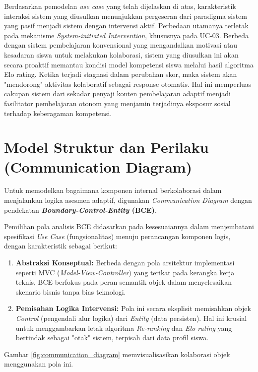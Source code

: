 Berdasarkan pemodelan \textit{use case} yang telah dijelaskan di atas, karakteristik interaksi sistem yang
diusulkan menunjukkan pergeseran dari paradigma sistem yang pasif menjadi sistem dengan intervensi aktif.
Perbedaan utamanya terletak pada mekanisme \textit{System-initiated Intervention}, khususnya pada UC-03.
Berbeda dengan sistem pembelajaran konvensional yang mengandalkan motivasi atau kesadaran siswa untuk
melakukan kolaborasi, sistem yang diusulkan ini akan secara proaktif memantau kondisi model kompetensi siswa
melalui hasil algoritma Elo rating. Ketika terjadi stagnasi dalam perubahan skor, maka sistem akan "mendorong"
aktivitas kolaboratif sebagai response otomatis. Hal ini memperluas cakupan sistem dari sekadar penyaji konten
pembelajaran adaptif menjadi fasilitator pembelajaran otonom yang menjamin terjadinya eksposur sosial
terhadap keberagaman kompetensi.

\section{Model Struktur dan Perilaku (Communication Diagram)}
\label{sec:structure_behavior_model}

Untuk memodelkan bagaimana komponen internal berkolaborasi dalam menjalankan logika asesmen adaptif, digunakan \textit{Communication Diagram} dengan pendekatan \textbf{\textit{Boundary-Control-Entity} (BCE)}.

Pemilihan pola analisis BCE didasarkan pada kesesuaiannya dalam menjembatani spesifikasi \textit{Use Case} (fungsionalitas) menuju perancangan komponen logis, dengan karakteristik sebagai berikut:
\begin{enumerate}
    \item \textbf{Abstraksi Konseptual:} Berbeda dengan pola arsitektur implementasi seperti MVC (\textit{Model-View-Controller}) yang terikat pada kerangka kerja teknis, BCE berfokus pada peran semantik objek dalam menyelesaikan skenario bisnis tanpa bias teknologi.
    \item \textbf{Pemisahan Logika Intervensi:} Pola ini secara eksplisit memisahkan objek \textit{Control} (pengendali alur logika) dari \textit{Entity} (data persisten). Hal ini krusial untuk menggambarkan letak algoritma \textit{Re-ranking} dan \textit{Elo rating} yang bertindak sebagai "otak" sistem, terpisah dari data profil siswa.
\end{enumerate}

Gambar \ref{fig:communication_diagram} memvisualisasikan kolaborasi objek menggunakan pola ini.

